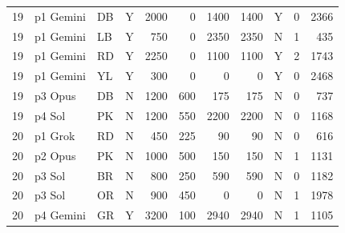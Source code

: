\begin{longtable}{r l l l r r r r l r r}
19 & p1 Gemini & DB & Y & 2000 & 0 & 1400 & 1400 & Y & 0 & 2366 \\
19 & p1 Gemini & LB & Y & 750 & 0 & 2350 & 2350 & N & 1 & 435 \\
19 & p1 Gemini & RD & Y & 2250 & 0 & 1100 & 1100 & Y & 2 & 1743 \\
19 & p1 Gemini & YL & Y & 300 & 0 & 0 & 0 & Y & 0 & 2468 \\
19 & p3 Opus & DB & N & 1200 & 600 & 175 & 175 & N & 0 & 737 \\
19 & p4 Sol & PK & N & 1200 & 550 & 2200 & 2200 & N & 0 & 1168 \\
20 & p1 Grok & RD & N & 450 & 225 & 90 & 90 & N & 0 & 616 \\
20 & p2 Opus & PK & N & 1000 & 500 & 150 & 150 & N & 1 & 1131 \\
20 & p3 Sol & BR & N & 800 & 250 & 590 & 590 & N & 0 & 1182 \\
20 & p3 Sol & OR & N & 900 & 450 & 0 & 0 & N & 1 & 1978 \\
20 & p4 Gemini & GR & Y & 3200 & 100 & 2940 & 2940 & N & 1 & 1105 \\
\end{longtable}
\endgroup
{}
